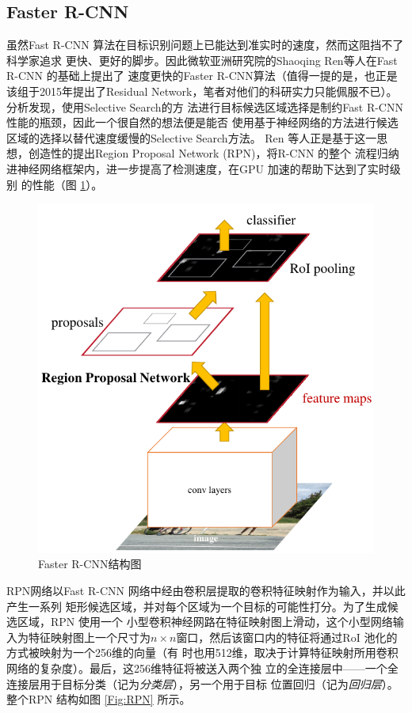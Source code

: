 \subsection{Faster R-CNN}

虽然Fast R-CNN 算法在目标识别问题上已能达到准实时的速度，然而这阻挡不了科学家追求
更快、更好的脚步。因此微软亚洲研究院的Shaoqing Ren等人在Fast R-CNN 的基础上提出了
速度更快的Faster R-CNN算法\cite{Ren:2015ug}（值得一提的是，也正是该组于2015年提出了Residual
Network，笔者对他们的科研实力只能佩服不已）。分析发现，使用Selective Search的方
法进行目标候选区域选择是制约Fast R-CNN 性能的瓶颈，因此一个很自然的想法便是能否
使用基于神经网络的方法进行候选区域的选择以替代速度缓慢的Selective Search方法。
Ren 等人正是基于这一思想，创造性的提出Region Proposal Network (RPN)，将R-CNN 的整个
流程归纳进神经网络框架内，进一步提高了检测速度，在GPU 加速的帮助下达到了实时级别
的性能（图 \ref{Fig:FasterRCNN}）。

\begin{figure}[ht]
  \centering
  \includegraphics[width=1.0\linewidth]{./Figure/FasterRCNN.png}
  \caption{Faster R-CNN结构图\cite{Ren:2015ug}}\label{Fig:FasterRCNN}
\end{figure}

RPN网络以Fast R-CNN 网络中经由卷积层提取的卷积特征映射作为输入，并以此产生一系列
矩形候选区域，并对每个区域为一个目标的可能性打分。为了生成候选区域，RPN 使用一个
小型卷积神经网路在特征映射图上滑动，这个小型网络输入为特征映射图上一个尺寸为$n
\times n$窗口，然后该窗口内的特征将通过RoI 池化的方式被映射为一个256维的向量（有
时也用512维，取决于计算特征映射所用卷积网络的复杂度）。最后，这256维特征将被送入两个独
立的全连接层中——一个全连接层用于目标分类（记为\textit{分类层}），另一个用于目标
位置回归（记为\textit{回归层}）。整个RPN 结构如图 \ref{Fig:RPN} 所示。

